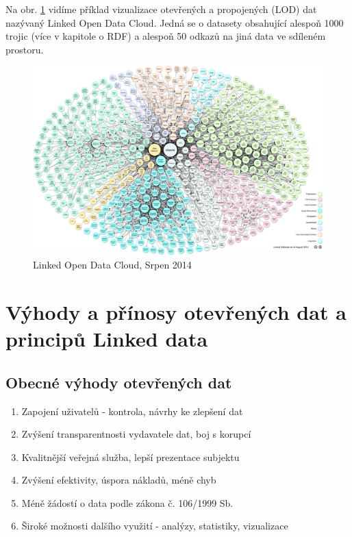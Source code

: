 Na obr. \ref{obr:lodcloud} vidíme příklad vizualizace otevřených a propojených (LOD) dat nazývaný Linked Open Data Cloud. Jedná se o datasety obsahující alespoň 1000 trojic (více v kapitole o RDF) a alespoň 50 odkazů na jiná data ve sdíleném prostoru.  

\newpage

\begin{figure}[h]
\centerline{\includegraphics[width=\textwidth]{img/lodcloud.eps}}
\caption{Linked Open Data Cloud, Srpen 2014}
\label{obr:lodcloud}
\end{figure}

\section{Výhody a přínosy otevřených dat a principů Linked data}

\subsection*{Obecné výhody otevřených dat}

\begin{enumerate}
\item Zapojení uživatelů - kontrola, návrhy ke zlepšení dat   
\item Zvýšení transparentnosti vydavatele dat, boj s korupcí
\item Kvalitnější veřejná služba, lepší prezentace subjektu
\item Zvýšení efektivity, úspora nákladů, méně chyb
\item Méně žádostí o data podle zákona č. 106/1999 Sb.\cite{z106} 
\item Široké možnosti dalšího využití - analýzy, statistiky, vizualizace
\end{enumerate}

